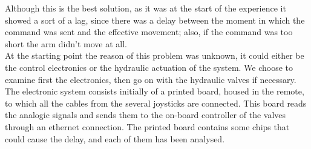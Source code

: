 \documentclass[12pt, a4paper]{article}
\begin{document}
Although this is the best solution, as it was at the start of the experience it showed a sort of a lag, since there was a delay between the moment in which the command was sent and the effective movement; also, if the command was too short the arm didn’t move at all. 
\\
At the starting point the reason of this problem was unknown, it could either be the control electronics or the hydraulic actuation of the system. We choose to examine first the electronics, then go on with the hydraulic valves if necessary.
\\ 


The electronic system consists initially of a printed board, housed in the remote, to which all the cables from the several joysticks are connected. This board reads the analogic signals and sends them to the on-board controller of the valves through an ethernet connection. The printed board contains some chips that could cause the delay, and each of them has been analysed.
\end{document}
